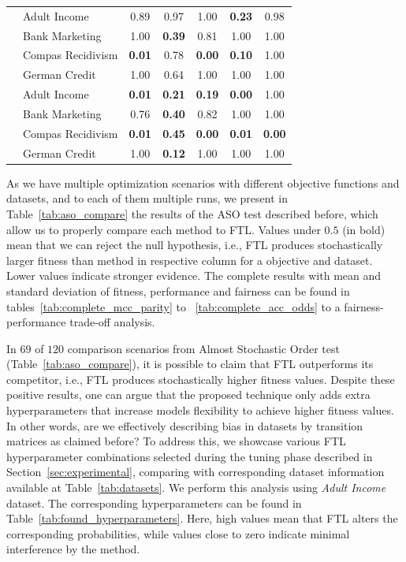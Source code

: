 \begin{table}[ht]
{\begin{tabular}{llccccc}
 & Adult Income & 0.89 & 0.97 & 1.00 & \textbf{0.23} & 0.98 \\
 & Bank Marketing & 1.00 & \textbf{0.39} & 0.81 & 1.00 & 1.00 \\
 & Compas Recidivism & \textbf{0.01} & 0.78 & \textbf{0.00} & \textbf{0.10} & 1.00 \\
 & German Credit & 1.00 & 0.64 & 1.00 & 1.00 & 1.00 \vspace{1ex}\\

 & Adult Income & \textbf{0.01} & \textbf{0.21} & \textbf{0.19} & \textbf{0.00} & 1.00 \\
 & Bank Marketing & 0.76 & \textbf{0.40} & 0.82 & 1.00 & 1.00 \\
 & Compas Recidivism & \textbf{0.01} & \textbf{0.45} & \textbf{0.00} & \textbf{0.01} & \textbf{0.00} \\
 & German Credit & 1.00 & \textbf{0.12} & 1.00 & 1.00 & 1.00 \\

\bottomrule
\end{tabular}


    }
\end{table}

As we have multiple optimization scenarios with different objective functions and datasets, and to each of them multiple runs, we present in Table~\ref{tab:aso_compare} the results of the ASO test described before, which allow us to properly compare each method to FTL. Values under $0.5$ (in bold) mean that we can reject the null hypothesis, i.e., FTL produces stochastically larger fitness than method in respective column for a objective and dataset. Lower values indicate stronger evidence. The complete results with mean and standard deviation of fitness, performance and fairness can be found in tables~\ref{tab:complete_mcc_parity} to ~\ref{tab:complete_acc_odds} to a fairness-performance trade-off analysis.

In $69$ of $120$ comparison scenarios from Almost Stochastic Order test (Table~\ref{tab:aso_compare}), it is possible to claim that FTL outperforms its competitor, i.e., FTL produces stochastically higher fitness values. Despite these positive results, one can argue that the proposed technique only adds extra hyperparameters that increase models flexibility to achieve higher fitness values. In other words, are we effectively describing bias in datasets by transition matrices as claimed before? To address this, we showcase various FTL hyperparameter combinations selected during the tuning phase described in Section~\ref{sec:experimental}, comparing with corresponding dataset information available at Table~\ref{tab:datasets}. We perform this analysis using \textit{Adult Income} dataset. The corresponding hyperparameters can be found in Table~\ref{tab:found_hyperparameters}. Here, high values mean that FTL alters the corresponding probabilities, while values close to zero indicate minimal interference by the method.

